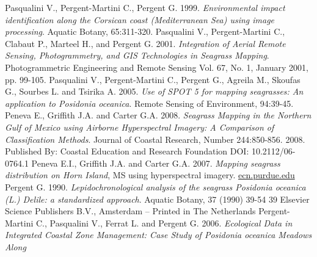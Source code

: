 \documentclass[11pt]{article}
\begin{document}
\begin{thebibliography}{999}
Pasqualini V., Pergent-Martini C., Pergent G. 1999. \emph{Environmental impact identification along the Corsican coast (Mediterranean Sea) using image processing}. Aquatic Botany,
65:311-320. \pageref{Pasqualini99}
Pasqualini V., Pergent-Martini C., Clabaut P., Marteel H., and Pergent G. 2001. \emph{Integration of Aerial Remote Sensing, Photogrammetry, and GIS Technologies in Seagrass
Mapping}. Photogrammetric Engineering and Remote Sensing Vol. 67, No. 1, January 2001, pp. 99-105. \pageref{Pasqualini01}
Pasqualini V., Pergent-Martini C., Pergent G., Agreila M., Skoufas G., Sourbes L. and Tsirika A. 2005. \emph{Use of SPOT 5 for mapping seagrasses: An application to Posidonia oceanica}. Remote Sensing of Environment, 94:39-45. \pageref{Pasqualini05}
Peneva E., Griffith J.A. and Carter G.A. 2008. \emph{Seagrass Mapping in the Northern Gulf of Mexico using Airborne Hyperspectral Imagery: A Comparison of Classification Methods}. Journal of Coastal Research, Number 244:850-856. 2008. Published By: Coastal Education and Research Foundation DOI: 10.2112/06-0764.1 \pageref{Peneva08}
Peneva E.I., Griffith J.A. and Carter G.A. 2007. \emph{Mapping seagrass distribution on Horn Island}, MS using hyperspectral imagery.
\href{ftp://ftp.ecn.purdue.edu/jshan/proceedings/asprs2005/Files/0134.pdf}{ecn.purdue.edu} \pageref{Peneva07}
Pergent G. 1990. \emph{Lepidochronological analysis of the seagrass \textit{{Posidonia oceanica}} (L.)
Delile: a standardized approach}. Aquatic Botany, 37 (1990) 39-54 39 Elsevier Science Publishers B.V., Amsterdam -- Printed in The Netherlands \pageref{Pergent90}
Pergent-Martini C., Pasqualini V., Ferrat L. and Pergent G. 2006. \emph{Ecological Data in Integrated Coastal Zone Management: Case Study of \textit{{Posidonia oceanica}} Meadows Along
}
\end{thebibliography}
\end{document}
